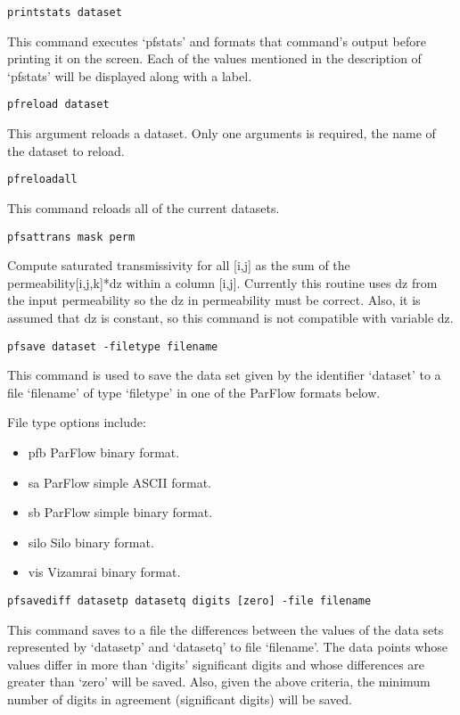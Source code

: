 \begin{description}
\item{\begin{verbatim}printstats dataset\end{verbatim}}
This command executes `pfstats' and formats that command's output
before printing it on the screen.  Each of the values mentioned in the
description of `pfstats' will be displayed along with a label.


\item{\begin{verbatim}pfreload dataset\end{verbatim}}
This argument reloads a dataset. Only one arguments is required, the name of the dataset to reload.

\item{\begin{verbatim}pfreloadall\end{verbatim}}
This command reloads all of the current datasets.

\item{\begin{verbatim}pfsattrans mask perm\end{verbatim}}
Compute saturated transmissivity for all [i,j] as the sum of the
permeability[i,j,k]*dz within a column [i,j]. Currently this routine
uses dz from the input permeability so the dz in permeability must be correct.
Also, it is assumed that dz is constant, so this command is not compatible with variable dz.


\item{\begin{verbatim}pfsave dataset -filetype filename\end{verbatim}}
This command is used to save the data set given by the identifier
`dataset' to a file `filename' of type `filetype' in one of the
ParFlow formats below.

File type options include:
\begin{itemize}
\item{pfb}  ParFlow binary format.
\item{sa}  ParFlow simple ASCII format.
\item{sb}  ParFlow simple binary format.
\item{silo} Silo binary format.
\item{vis}  Vizamrai binary format.
\end{itemize}

\item{\begin{verbatim}pfsavediff datasetp datasetq digits [zero] -file filename
\end{verbatim}}
This command saves to a file the differences between the values
of the data sets represented by `datasetp' and `datasetq' to file
`filename'.  The data points whose values differ in more than
`digits' significant digits and whose differences are greater than
`zero' will be saved.  Also, given the above criteria, the
minimum number of digits in agreement (significant digits) will be
saved.


\end{description}

